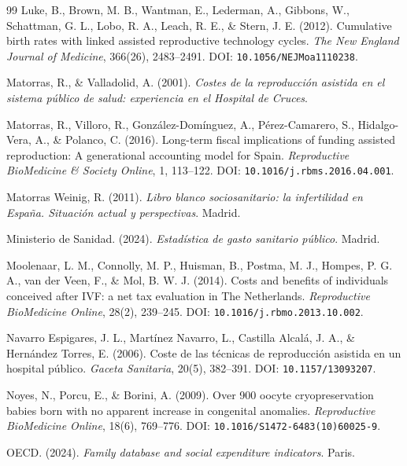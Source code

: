 \documentclass[12pt,a4paper]{article}
\begin{document}
\begin{thebibliography}{99}
Luke, B., Brown, M. B., Wantman, E., Lederman, A., Gibbons, W.,
Schattman, G. L., Lobo, R. A., Leach, R. E., \& Stern, J. E. (2012).
Cumulative birth rates with linked assisted reproductive technology
cycles. \emph{The New England Journal of Medicine}, 366(26), 2483--2491.
DOI: \nolinkurl{10.1056/NEJMoa1110238}.

Matorras, R., \& Valladolid, A. (2001). \emph{Costes de la
reproducci\'on asistida en el sistema p\'ublico de salud: experiencia en
el Hospital de Cruces}.

Matorras, R., Villoro, R., Gonz\'alez-Dom\'inguez, A.,
P\'erez-Camarero, S., Hidalgo-Vera, A., \& Polanco, C. (2016).
Long-term fiscal implications of funding assisted reproduction: A
generational accounting model for Spain. \emph{Reproductive
BioMedicine \& Society Online}, 1, 113--122. DOI:
\nolinkurl{10.1016/j.rbms.2016.04.001}.

Matorras Weinig, R. (2011). \emph{Libro blanco sociosanitario: la
infertilidad en Espa\~na. Situaci\'on actual y perspectivas}. Madrid.

Ministerio de Sanidad. (2024). \emph{Estad\'istica de gasto sanitario
p\'ublico}. Madrid.

Moolenaar, L. M., Connolly, M. P., Huisman, B., Postma, M. J., Hompes,
P. G. A., van der Veen, F., \& Mol, B. W. J. (2014). Costs and
benefits of individuals conceived after IVF: a net tax evaluation in
The Netherlands. \emph{Reproductive BioMedicine Online}, 28(2),
239--245. DOI: \nolinkurl{10.1016/j.rbmo.2013.10.002}.

Navarro Espigares, J. L., Mart\'inez Navarro, L., Castilla Alcal\'a,
J. A., \& Hern\'andez Torres, E. (2006). Coste de las t\'ecnicas de
reproducci\'on asistida en un hospital p\'ublico. \emph{Gaceta
Sanitaria}, 20(5), 382--391. DOI: \nolinkurl{10.1157/13093207}.

Noyes, N., Porcu, E., \& Borini, A. (2009). Over 900 oocyte
cryopreservation babies born with no apparent increase in congenital
anomalies. \emph{Reproductive BioMedicine Online}, 18(6), 769--776.
DOI: \nolinkurl{10.1016/S1472-6483(10)60025-9}.

OECD. (2024). \emph{Family database and social expenditure indicators}.
Paris.


\end{thebibliography}
\end{document}
